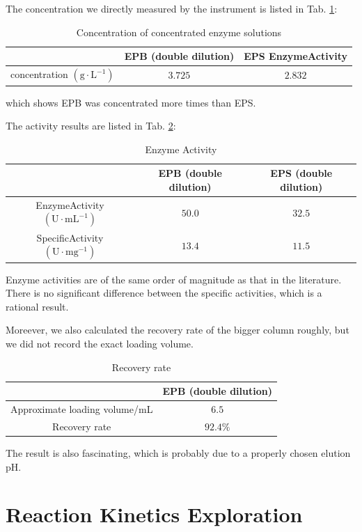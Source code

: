 The concentration we directly measured by the instrument is listed in Tab. \ref{tab:conc}:
\begin{table}[!h]
	\centering
	\caption{Concentration of concentrated enzyme solutions}
	\begin{tabular}{ccc}
		\toprule
		& {EPB (double dilution)} & {EPS EnzymeActivity} \\
		\midrule
		concentration $(\mathrm{g\cdot L^{-1}})$ & $3.725$  & $2.832$ \\
		\bottomrule
	\end{tabular}%
	\label{tab:conc}%
\end{table}%
which shows EPB was concentrated more times than EPS.

The activity results are listed in Tab. \ref{tab:res}:
\begin{table}[!h]
	\centering
	\caption{Enzyme Activity}
	\begin{tabular}{ccc}
		\toprule
		& {EPB (double dilution)} & {EPS (double dilution)} \\
		\midrule
		EnzymeActivity $(\mathrm{U\cdot mL^{-1}})$ & $50.0$  & $32.5$ \\
		SpecificActivity $(\mathrm{U\cdot mg^{-1}})$ & $13.4$ & $11.5$\\
		\bottomrule
	\end{tabular}%
	\label{tab:res}%
\end{table}%

Enzyme activities are of the same order of magnitude as that in the literature. 
There is no significant difference between the specific activities, which is a rational result.

Moreever, we also calculated the recovery rate of the bigger column roughly, but we did not record the exact loading volume.

\begin{table}[!h]
	\centering
	\caption{Recovery rate}
	\begin{tabular}{cc}
		\toprule
		& {EPB (double dilution)}\\
		\midrule
		Approximate loading volume/mL  & $6.5$ \\
		Recovery rate  & $92.4\%$ \\
		\bottomrule
	\end{tabular}%
	\label{tab:rec}%
\end{table}%

The result is also fascinating, which is probably due to a properly chosen elution pH.

\section{Reaction Kinetics Exploration}

